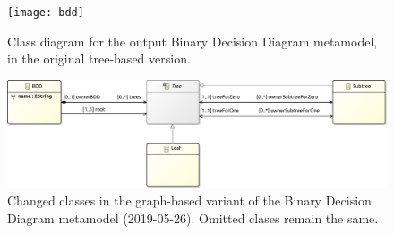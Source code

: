 \documentclass[a4paper]{scrartcl}
\begin{document}
\begin{figure}
  \centering
  \texttt{[image: bdd]}
  \caption{Class diagram for the output Binary Decision Diagram metamodel, in the original tree-based version.}
  \label{fig:bdd-metamodel}
\end{figure}

\begin{figure}
  \centering
  \includegraphics[width=.9\textwidth]{bddGraph}
  \caption{Changed classes in the graph-based variant of the Binary Decision Diagram metamodel (2019-05-26). Omitted clases remain the same.}
  \label{fig:bddg-metamodel}
\end{figure}
\end{document}
